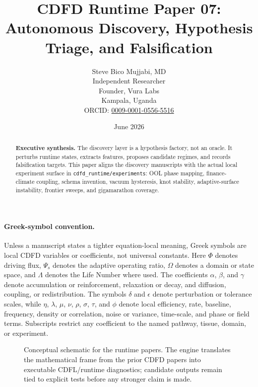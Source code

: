 \documentclass[12pt,a4paper]{article}
\title{\textbf{CDFD Runtime Paper 07: Autonomous Discovery, Hypothesis Triage, and Falsification}}
\author{Steve Bico Mujjabi, MD\\
\small Independent Researcher\\
\small Founder, Vura Labs\\
\small Kampala, Uganda\\
\small ORCID: \href{https://orcid.org/0009-0001-0556-5516}{0009-0001-0556-5516}}
\date{June 2026}
\begin{document}
\maketitle

\begin{abstract}
\noindent \textbf{Executive synthesis.} The discovery layer is a hypothesis
factory, not an oracle. It perturbs runtime states, extracts features, proposes
candidate regimes, and records falsification targets. This paper aligns the
discovery manuscripts with the actual local experiment surface in
\texttt{cdfd\_runtime/experiments}: OOL phase mapping, finance-climate coupling,
schema invention, vacuum hysteresis, knot stability, adaptive-surface
instability, frontier sweeps, and gigamarathon coverage.
\end{abstract}

\paragraph{Greek-symbol convention.}
Unless a manuscript states a tighter equation-local meaning, Greek symbols are local CDFD variables or coefficients, not universal constants. Here $\Phi$ denotes driving flux, $\Psi_s$ denotes the adaptive operating ratio, $\Omega$ denotes a domain or state space, and $\Lambda$ denotes the Life Number where used. The coefficients $\alpha$, $\beta$, and $\gamma$ denote accumulation or reinforcement, relaxation or decay, and diffusion, coupling, or redistribution. The symbols $\delta$ and $\epsilon$ denote perturbation or tolerance scales, while $\eta$, $\lambda$, $\mu$, $\nu$, $\rho$, $\sigma$, $\tau$, and $\phi$ denote local efficiency, rate, baseline, frequency, density or correlation, noise or variance, time-scale, and phase or field terms. Subscripts restrict any coefficient to the named pathway, tissue, domain, or experiment.


\begin{figure}[ht]
\centering
{}
\caption{Conceptual schematic for the runtime papers. The engine translates the mathematical frame from the prior CDFD papers into executable CDFL/runtime diagnostics; candidate outputs remain tied to explicit tests before any stronger claim is made.}
\end{figure}
\end{document}
